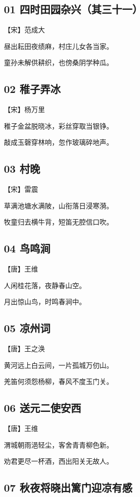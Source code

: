 \documentclass[a6paper, 12pt]{article}
\begin{document}
\subsection*{01 四时田园杂兴（其三十一）}

【宋】范成大

昼出耘田夜绩麻，村庄儿女各当家。

童孙未解供耕织，也傍桑阴学种瓜。

\subsection*{02 稚子弄冰}

【宋】杨万里

稚子金盆脱晓冰，彩丝穿取当银铮。

敲成玉磬穿林响，忽作玻璃碎地声。

\subsection*{03 村晚}


【宋】雷震

草满池塘水满陂，山衔落日浸寒漪。

牧童归去横牛背，短笛无腔信口吹。

\subsection*{04 鸟鸣涧}

【唐】王维

人闲桂花落，夜静春山空。

月出惊山鸟，时鸣春涧中。

\subsection*{05 凉州词}

【唐】王之涣

黄河远上白云间，一片孤城万仞山。

羌笛何须怨杨柳，春风不度玉门关。

\subsection*{06 送元二使安西}

【唐】王维

渭城朝雨浥轻尘，客舍青青柳色新。

劝君更尽一杯酒，西出阳关无故人。

\subsection*{07 秋夜将晓出篱门迎凉有感}
\end{document}
